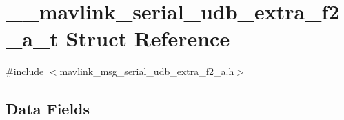 \hypertarget{struct____mavlink__serial__udb__extra__f2__a__t}{\section{\+\_\+\+\_\+mavlink\+\_\+serial\+\_\+udb\+\_\+extra\+\_\+f2\+\_\+a\+\_\+t Struct Reference}
\label{struct____mavlink__serial__udb__extra__f2__a__t}
}


{\ttfamily \#include $<$mavlink\+\_\+msg\+\_\+serial\+\_\+udb\+\_\+extra\+\_\+f2\+\_\+a.\+h$>$}

\subsection*{Data Fields}
